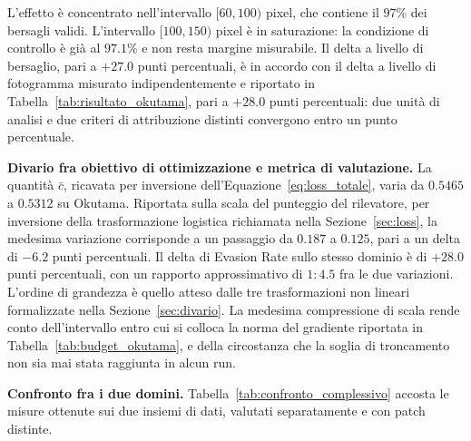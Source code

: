 \documentclass[a4paper,12pt]{report}
\begin{document}
L'effetto è concentrato nell'intervallo $[60, 100)$ pixel, che contiene il $97\%$ dei bersagli validi. L'intervallo $[100, 150)$ pixel è in saturazione: la condizione di controllo è già al $97.1\%$ e non resta margine misurabile. Il delta a livello di bersaglio, pari a $+27.0$ punti percentuali, è in accordo con il delta a livello di fotogramma misurato indipendentemente e riportato in Tabella~\ref{tab:risultato_okutama}, pari a $+28.0$ punti percentuali: due unità di analisi e due criteri di attribuzione distinti convergono entro un punto percentuale.

\textbf{Divario fra obiettivo di ottimizzazione e metrica di valutazione.}
\label{sec:risultato_divario}
La quantità $\bar{c}$, ricavata per inversione dell'Equazione~\ref{eq:loss_totale}, varia da $0.5465$ a $0.5312$ su Okutama. Riportata sulla scala del punteggio del rilevatore, per inversione della trasformazione logistica richiamata nella Sezione~\ref{sec:loss}, la medesima variazione corrisponde a un passaggio da $0.187$ a $0.125$, pari a un delta di $-6.2$ punti percentuali. Il delta di Evasion Rate sullo stesso dominio è di $+28.0$ punti percentuali, con un rapporto approssimativo di $1{:}4.5$ fra le due variazioni. L'ordine di grandezza è quello atteso dalle tre trasformazioni non lineari formalizzate nella Sezione~\ref{sec:divario}. La medesima compressione di scala rende conto dell'intervallo entro cui si colloca la norma del gradiente riportata in Tabella~\ref{tab:budget_okutama}, e della circostanza che la soglia di troncamento non sia mai stata raggiunta in alcun run.

\textbf{Confronto fra i due domini.}
\label{sec:confronto_complessivo}
Tabella~\ref{tab:confronto_complessivo} accosta le misure ottenute sui due insiemi di dati, valutati separatamente e con patch distinte.
\end{document}
